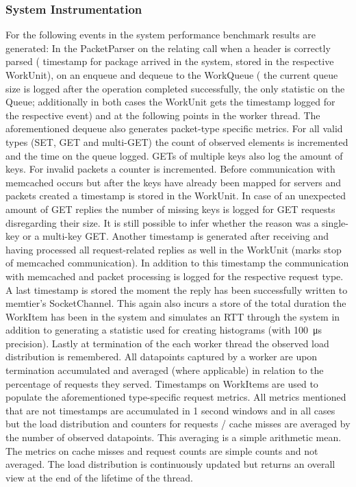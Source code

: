     \subsubsection{System Instrumentation}
        For the following events in the system performance benchmark results are generated: In the PacketParser on the
        relating call when a header is correctly parsed (\textrightarrow{} timestamp for package arrived in the system,
        stored in the respective WorkUnit), on an enqueue and dequeue to the WorkQueue (\textrightarrow{} the current
        queue size is logged after the operation completed successfully, the only statistic on the Queue; additionally
        in both cases the WorkUnit gets the timestamp logged for the respective event) and at the following points in
        the worker thread. The aforementioned dequeue also generates packet-type specific metrics. For all valid types
        (SET, GET and multi-GET) the count of observed elements is incremented and the time on the queue logged. GETs of
        multiple keys also log the amount of keys. For invalid packets a counter is incremented. Before communication
        with memcached occurs but after the keys have already been mapped for servers and packets created a timestamp is
        stored in the WorkUnit. In case of an unexpected amount of GET replies the number of missing keys is logged for
        GET requests disregarding their size. It is still possible to infer whether the reason was a single-key or a
        multi-key GET. Another timestamp is generated after receiving and having processed all request-related replies
        as well in the WorkUnit (marks stop of memcached communication). In addition to this timestamp the communication
        with memcached and packet processing is logged for the respective request type. A last timestamp is stored the
        moment the reply has been successfully written to memtier's SocketChannel. This again also incurs a store of the
        total duration the WorkItem has been in the system and simulates an RTT through the system in addition to
        generating a statistic used for creating histograms (with \SI{100}{\micro\second} precision). Lastly at
        termination of the each worker thread the observed load distribution is remembered. All datapoints captured by a
        worker are upon termination accumulated and averaged (where applicable) in relation to the percentage of
        requests they served.\newline
        Timestamps on WorkItems are used to populate the aforementioned type-specific request metrics. All metrics
        mentioned that are not timestamps are accumulated in 1 second windows and in all cases but the load distribution
        and counters for requests / cache misses are averaged by the number of observed datapoints. This averaging is a
        simple arithmetic mean. The metrics on cache misses and request counts are simple counts and not averaged. The
        load distribution is continuously updated but returns an overall view at the end of the lifetime of the thread.

